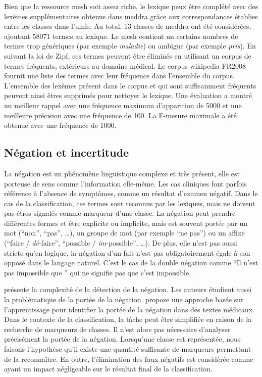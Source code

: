 Bien que la ressource \gls{mesh} soit assez riche, le lexique peux être complété avec des lexèmes supplémentaires obtenus dans \gls{meddra} grâce aux correspondances établies entre les classes dans l'\gls{umls}.
Au total, \num{13} classes de \gls{meddra} ont été considérées, ajoutant \num{58071} termes au lexique.
Le \gls{mesh} contient un certains nombres de termes trop génériques (par exemple \emph{maladie}) ou ambigus (par exemple \emph{pris}).
En suivant la loi de Zipf, ces termes peuvent être éliminés en utilisant un corpus de termes fréquents, extérieurs au domaine médical.
Le corpus \gls{wikipedia} FR2008 \cite{REDACCorpusTexte2008} fournit une liste des termes avec leur fréquence dans l'ensemble du corpus.
L'ensemble des lexèmes présent dans le corpus et qui sont suffisamment fréquents peuvent ainsi êtres supprimés pour nettoyer le lexique.
Une évaluation a montré un meilleur rappel avec une fréquence maximum d'apparition de \num{5000} et une meilleure précision avec une fréquence de \num{100}.
La F-mesure maximale a été obtenue avec une fréquence de \num{1000}.

\subsection{Négation et incertitude}
\label{sec:class:neg}
La négation est un phénomène linguistique complexe et très présent, elle est porteuse de sens comme l'information elle-même.
Les cas cliniques font parfois référence à l'absence de symptômes, comme un résultat d'examen négatif.
Dans le cas de la classification, ces termes sont reconnus par les lexiques, mais ne doivent pas êtres signalés comme marqueur d'une classe.
La négation peut prendre différentes formes et être explicite ou implicite, mais est souvent portée par un mot (\enquote{non}, \enquote{pas}, \dots), un groupe de mot (par exemple \enquote{ne \textelp{} pas}) ou un affixe (\enquote{faire / \emph{dé}-faire}, \enquote{possible / \emph{im}-possible}, \dots).
De plus, elle n'est pas aussi stricte qu'en logique, la négation d'un fait n'est pas obligatoirement égale à son opposé dans le langage naturel.
C'est le cas de la double négation comme \enquote{Il n'est pas impossible que \textelp{}} qui ne signifie pas que c'est impossible.

\cite{blancoIssuesDetectingNegation2011} présente la complexité de la détection de la négation.
Les auteurs étudient aussi la problématique de la portée de la négation.
\cite{moranteLearningScopeNegation2008} propose une approche basée sur l'apprentissage pour identifier la portée de la négation dans des textes médicaux.
Dans le contexte de la classification, la tâche peut être simplifiée en raison de la recherche de marqueurs de classes.
Il n'est alors pas nécessaire d'analyser précisément la portée de la négation.
Lorsqu'une classe est représentée, nous faisons l'hypothèse qu'il existe une quantité suffisante de marqueurs permettant de la reconnaître.
En outre, l'élimination des faux négatifs est considérée comme ayant un impact négligeable sur le résultat final de la classification.


